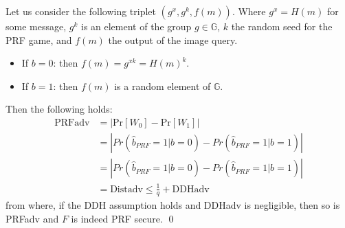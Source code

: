 Let us consider the following triplet $(g^{x},g^{k}, f(m))$.
Where $g^{x}=H(m)$ for some message, $g^{k}$ is an element of the group $g\in\mathbb{G}$, $k$ the random seed for the PRF game, and $f(m)$ the output of the image query.
\begin{itemize}
    \item If $b = 0$: then $f(m) = g^{xk} = H(m)^k$. 
    \item If $b = 1$: then $f(m)$ is a random element of $\mathbb{G}$.
\end{itemize}
Then the following holds:
\begin{equation*}
    \begin{split}
        \text{PRFadv} & = \left\vert \text{Pr}[W_0] - \text{Pr}[W_1] \right\vert \\
            & = \left\vert Pr(\hat{b}_{PRF} = 1 | b = 0) - Pr(\hat{b}_{PRF} = 1 | b = 1)\right\vert \\
            & = \left\vert Pr(\hat{b}_{PRF} = 1 | b = 0) - Pr(\hat{b}_{PRF} = 1 | b = 1)\right\vert \\
            & = \text{Distadv} \leq \frac{1}{q} + \text{DDHadv}
    \end{split}
\end{equation*}
from where, if the DDH assumption holds and DDHadv is negligible, then so is PRFadv and $F$ is indeed PRF secure. \hfill \qed


